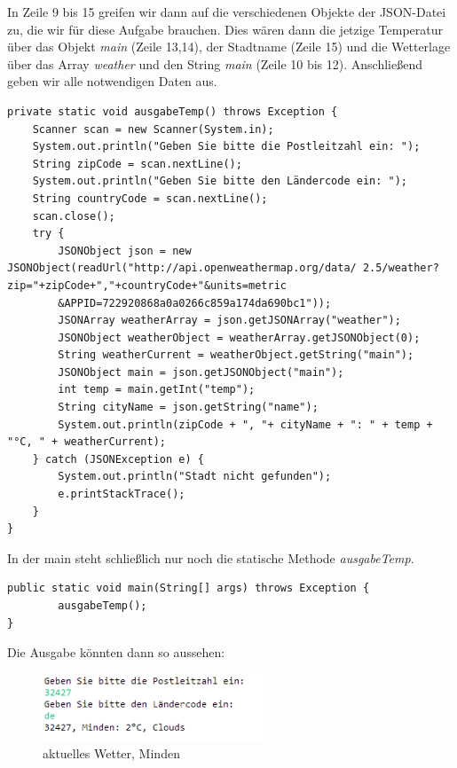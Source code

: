 In Zeile 9 bis 15 greifen wir dann auf die verschiedenen Objekte der JSON-Datei zu, die wir für diese Aufgabe brauchen. Dies wären dann die jetzige Temperatur über das Objekt \textit{main} (Zeile 13,14), der Stadtname (Zeile 15) und die Wetterlage über das Array \textit{weather} und den String \textit{main} (Zeile 10 bis 12). Anschließend geben wir alle notwendigen Daten aus. \\

\begin{lstlisting}[caption={ausgabeTemp}]
private static void ausgabeTemp() throws Exception {
	Scanner scan = new Scanner(System.in);
	System.out.println("Geben Sie bitte die Postleitzahl ein: ");
	String zipCode = scan.nextLine();
	System.out.println("Geben Sie bitte den Ländercode ein: ");
	String countryCode = scan.nextLine();
	scan.close();
	try {
		JSONObject json = new JSONObject(readUrl("http://api.openweathermap.org/data/ 2.5/weather?zip="+zipCode+","+countryCode+"&units=metric
		&APPID=722920868a0a0266c859a174da690bc1"));
		JSONArray weatherArray = json.getJSONArray("weather");
		JSONObject weatherObject = weatherArray.getJSONObject(0);
		String weatherCurrent = weatherObject.getString("main");
		JSONObject main = json.getJSONObject("main");
		int temp = main.getInt("temp");
		String cityName = json.getString("name");
		System.out.println(zipCode + ", "+ cityName + ": " + temp + "°C, " + weatherCurrent);
	} catch (JSONException e) {
		System.out.println("Stadt nicht gefunden");
		e.printStackTrace();
	}
}
\end{lstlisting}

In der main steht schließlich nur noch die statische Methode \textit{ausgabeTemp}.

\begin{lstlisting}[caption={main}]
public static void main(String[] args) throws Exception {
		ausgabeTemp();
}
\end{lstlisting}

\newpage

Die Ausgabe könnten dann so aussehen: 

\begin{figure}[htbp]
\begin{center}
\includegraphics[width=0.6\textwidth]{Bild2}
\caption{aktuelles Wetter, Minden}
\end{center}
\end{figure}


